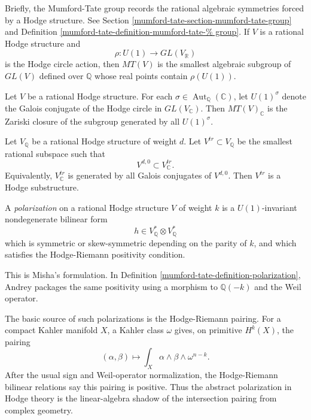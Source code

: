 \documentclass{book}
\begin{document}
\medskip
Briefly, the Mumford-Tate group records the
rational algebraic symmetries forced by a
Hodge structure.
See Section
\ref{mumford-tate-section-mumford-tate-group}
and Definition
\ref{mumford-tate-definition-mumford-tate-%
group}.
If $V$ is a rational Hodge structure and
$$
\rho:U(1)\longrightarrow
GL(V_{\mathbb{R}})
$$
is the Hodge circle action, then $MT(V)$ is
the smallest algebraic subgroup of $GL(V)$
defined over $\mathbb{Q}$ whose real points
contain $\rho(U(1))$.

\begin{proposition}
\label{proposition-mt-generated-galois}
Let $V$ be a rational Hodge structure.
For each
$\sigma\in\operatorname{Aut}_{\mathbb{Q}}
(\mathbb{C})$,
let $U(1)^\sigma$ denote the Galois conjugate
of the Hodge circle in
$GL(V_{\mathbb{C}})$.
Then $MT(V)_{\mathbb{C}}$ is the Zariski
closure of the subgroup generated by all
$U(1)^\sigma$.
\end{proposition}

\begin{theorem}
\label{theorem-transcendental-hodge-lattice}
Let $V_{\mathbb{Q}}$ be a rational Hodge
structure of weight $d$.
Let $V^{tr}\subset V_{\mathbb{Q}}$ be the
smallest rational subspace such that
$$
V^{d,0}\subset V^{tr}_{\mathbb{C}}.
$$
Equivalently, $V^{tr}_{\mathbb{C}}$ is
generated by all Galois conjugates of
$V^{d,0}$.
Then $V^{tr}$ is a Hodge substructure.
\end{theorem}

\begin{definition}
\label{definition-polarization-hodge}
A {\it polarization} on a rational Hodge
structure $V$ of weight $k$ is a
$U(1)$-invariant nondegenerate bilinear form
$$
h\in V_{\mathbb{Q}}^*\otimes
V_{\mathbb{Q}}^*
$$
which is symmetric or skew-symmetric
depending on the parity of $k$, and which
satisfies the Hodge-Riemann positivity
condition.
\end{definition}

\noindent
This is Misha's formulation.
In
Definition
\ref{mumford-tate-definition-polarization},
Andrey packages the same positivity using a
morphism to $\mathbb{Q}(-k)$ and the Weil
operator.

\medskip
The basic source of such polarizations is the
Hodge-Riemann pairing.
For a compact Kahler manifold $X$, a Kahler
class $\omega$ gives, on primitive
$H^k(X)$, the pairing
$$
(\alpha,\beta)\longmapsto
\int_X\alpha\wedge\beta\wedge\omega^{n-k}.
$$
After the usual sign and Weil-operator
normalization, the Hodge-Riemann bilinear
relations say this pairing is positive.
Thus the abstract polarization in Hodge
theory is the linear-algebra shadow of the
intersection pairing from complex geometry.
\end{document}
